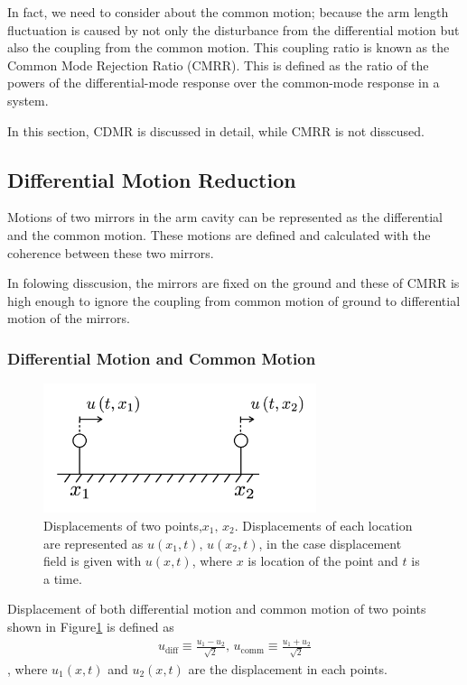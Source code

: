 \documentclass[a4paper,12pt]{book}
\begin{document}
In fact, we need to consider about the common motion; because the arm length fluctuation is caused by not only the disturbance from the differential motion but also the coupling from the common motion. This coupling ratio is known as the Common Mode Rejection Ratio (CMRR). This is defined as the ratio of the powers of the differential-mode response over the common-mode response in a system.

In this section, CDMR is discussed in detail, while CMRR is not disscused.

\subsection{Differential Motion Reduction}
Motions of two mirrors in the arm cavity can be represented as the differential and the common motion. These motions are defined and calculated with the coherence between these two mirrors. 

In folowing disscusion, the mirrors are fixed on the ground and these of CMRR is high enough to ignore the coupling from common motion of ground to differential motion of the mirrors.

\subsubsection{Differential Motion and Common Motion}
\begin{figure}[H]
  \begin{center}
    \includegraphics[width=8.0cm]{./img_cdmr_arm.png}
  \end{center}
  \caption{Displacements of two points,$x_1,\,x_2$. Displacements of each location are represented as $u(x_1,t),\, u(x_2,t)$, in the case displacement field is given with $u(x,t)$, where $x$ is location of the point and $t$ is a time.
  }\label{img:img_diffcomm}  
\end{figure}

Displacement of both differential motion and common motion of two points shown in Figure\ref{img:img_diffcomm} is defined as
\begin{eqnarray}\label{eq:eq22}
  u_{\mathrm{diff}} \equiv \frac{u_{1}-u_{2}}{\sqrt{2}}, \,
  u_{\mathrm{comm}}  \equiv \frac{u_{1}+u_{2}}{\sqrt{2}}
\end{eqnarray}
, where $u_{1}(x,t)$ and $u_2(x,t)$ are the displacement in each points.
\end{document}
